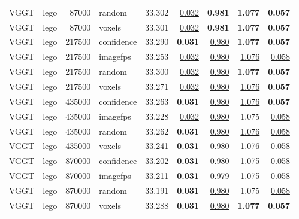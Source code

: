 \begin{table}[H]
\begin{tabular}{llrlrrrrr}
VGGT & lego & 87000 & random & 33.302 & \underline{0.032} & \textbf{0.981} & \textbf{1.077} & \textbf{0.057} \\
VGGT & lego & 87000 & voxels & 33.301 & \underline{0.032} & \textbf{0.981} & \textbf{1.077} & \textbf{0.057} \\
VGGT & lego & 217500 & confidence & 33.290 & \textbf{0.031} & \underline{0.980} & \textbf{1.077} & \textbf{0.057} \\
VGGT & lego & 217500 & imagefps & 33.253 & \underline{0.032} & \underline{0.980} & \underline{1.076} & \underline{0.058} \\
VGGT & lego & 217500 & random & 33.300 & \underline{0.032} & \underline{0.980} & \textbf{1.077} & \textbf{0.057} \\
VGGT & lego & 217500 & voxels & 33.271 & \underline{0.032} & \underline{0.980} & \underline{1.076} & \textbf{0.057} \\
VGGT & lego & 435000 & confidence & 33.263 & \textbf{0.031} & \underline{0.980} & \underline{1.076} & \textbf{0.057} \\
VGGT & lego & 435000 & imagefps & 33.228 & \underline{0.032} & \underline{0.980} & 1.075 & \underline{0.058} \\
VGGT & lego & 435000 & random & 33.262 & \textbf{0.031} & \underline{0.980} & \underline{1.076} & \underline{0.058} \\
VGGT & lego & 435000 & voxels & 33.241 & \textbf{0.031} & \underline{0.980} & \underline{1.076} & \underline{0.058} \\
VGGT & lego & 870000 & confidence & 33.202 & \textbf{0.031} & \underline{0.980} & 1.075 & \underline{0.058} \\
VGGT & lego & 870000 & imagefps & 33.211 & \textbf{0.031} & 0.979 & 1.075 & \underline{0.058} \\
VGGT & lego & 870000 & random & 33.191 & \textbf{0.031} & \underline{0.980} & 1.075 & \underline{0.058} \\
VGGT & lego & 870000 & voxels & 33.288 & \textbf{0.031} & \underline{0.980} & \textbf{1.077} & \textbf{0.057} \\
\bottomrule
\end{tabular}
\end{table}